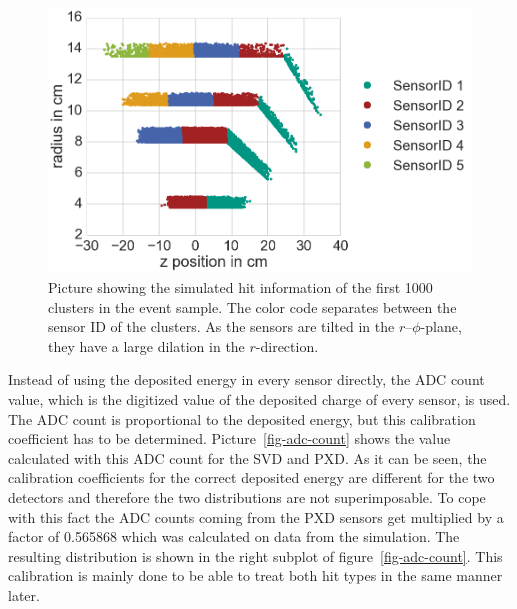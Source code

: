 \begin{figure}
 \centering
 \includegraphics[width=0.8\linewidth]{figures/vxd/cluster_positions.png}
 \caption[Picture showing the simulated hit information.]{Picture showing the simulated hit information of the first 1000 clusters in the event sample. The color code separates between the sensor ID of the clusters. As the sensors are tilted in the $r$--$\phi$-plane, they have a large dilation in the $r$-direction.}
 \label{fig-cluster-position}
\end{figure}

Instead of using the deposited energy in every sensor directly, the ADC count value, which is the digitized value of the deposited charge of every sensor, is used. The ADC count is proportional to the deposited energy, but this calibration coefficient has to be determined. %
Picture~\ref{fig-adc-count} shows the \dedx value calculated with this ADC count for the SVD and PXD. As it can be seen, the calibration coefficients for the correct deposited energy are different for the two detectors and therefore the two distributions are not superimposable. To cope with this fact the ADC counts coming from the PXD sensors get multiplied by a factor of 0.565868 which was calculated on data from the simulation. The resulting distribution is shown in the right subplot of figure~\ref{fig-adc-count}. This calibration is mainly done to be able to treat both hit types in the same manner later. 

